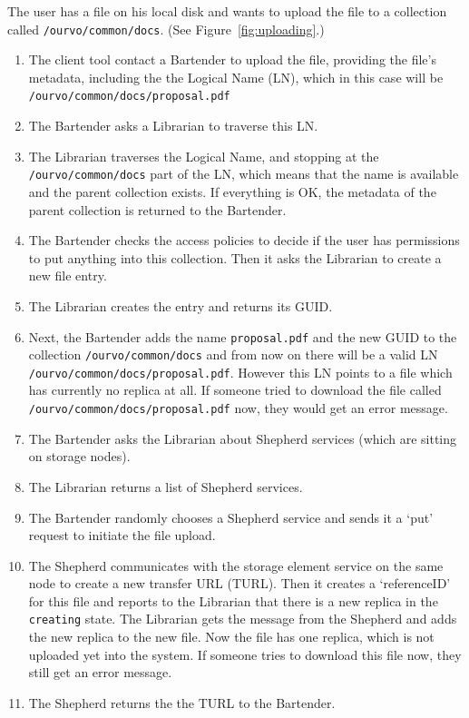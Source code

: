 \documentclass{book}
\begin{document}
The user has a file on his local disk and wants to upload the file to a collection called \verb#/ourvo/common/docs#. (See Figure~\ref{fig:uploading}.)
\begin{enumerate}
    \item The client tool contact a Bartender to upload the file, providing the file's metadata, including the the Logical Name (LN), which in this case will be \verb#/ourvo/common/docs/proposal.pdf#
    \item The Bartender asks a Librarian to traverse this LN.
    \item The Librarian traverses the Logical Name, and stopping at the \verb#/ourvo/common/docs# part of the LN, which means that the name is available and the parent collection exists. If everything is OK, the metadata of the parent collection is returned to the Bartender. 
    \item The Bartender checks the access policies to decide if the user has permissions to put anything into this collection. Then it asks the Librarian to create a new file entry. 
    \item The Librarian creates the entry and returns its GUID.
    \item Next, the Bartender adds the name \verb#proposal.pdf# and the new GUID to the collection \verb#/ourvo/common/docs# and from now on there will be a valid LN \verb#/ourvo/common/docs/proposal.pdf#. However this LN points to a file which has currently no replica at all. If someone tried to download the file called \verb#/ourvo/common/docs/proposal.pdf# now, they would get an error message.
    \item The Bartender asks the Librarian about Shepherd services (which are sitting on storage nodes).
    \item The Librarian returns a list of Shepherd services.
    \item The Bartender randomly chooses a Shepherd service and sends it a `put' request to initiate the file upload. 
    \item The Shepherd communicates with the storage element service on the same node to create a new transfer URL (TURL). Then it creates a `referenceID' for this file and reports to the Librarian that there is a new replica in the \verb#creating# state. The Librarian gets the message from the Shepherd and adds the new replica to the new file. Now the file has one replica, which is not uploaded yet into the system. If someone tries to download this file now, they still get an error message.
    \item The Shepherd returns the the TURL to the Bartender.

\end{enumerate}
\end{document}
